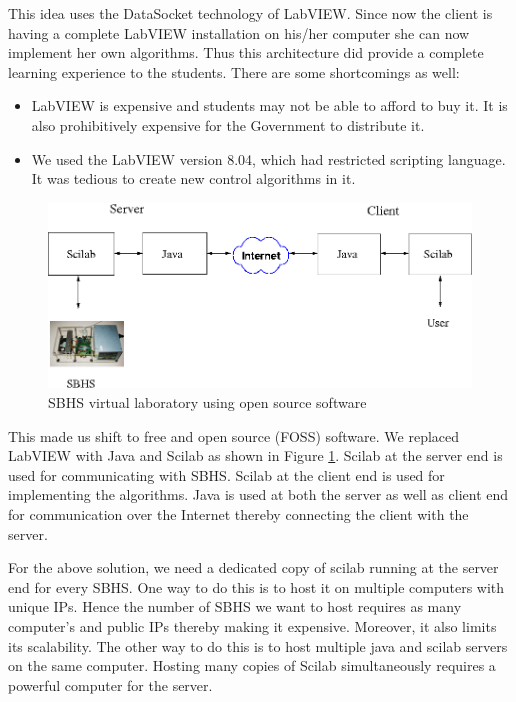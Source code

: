  This idea uses the DataSocket technology of LabVIEW. Since now the
 client is having a complete LabVIEW installation on his/her computer
 she can now implement her own algorithms.  Thus this architecture did
 provide a complete learning experience to the students.  There are
 some shortcomings as well:

\begin{itemize}
\item LabVIEW is expensive and students may not be able to afford to
  buy it.  It is also prohibitively expensive for the Government to
  distribute it.

\item We used the LabVIEW version 8.04, which had restricted scripting
  language.  It was tedious to create new control algorithms in it.
\end{itemize}
\begin{figure}
\includegraphics[width=\linewidth]{IEEE-Chile/figures/vlab-3.png}
\caption{SBHS virtual laboratory using open source software}
\label{fig:third}
\end{figure}
This made us shift to free and open source (FOSS) software. We
replaced LabVIEW with Java and Scilab as shown in Figure
\ref{fig:third}. Scilab at the server end is used for communicating
with SBHS. Scilab at the client end is used for implementing the
algorithms. Java is used at both the server as well as client end for
communication over the Internet thereby connecting the client with the
server. 

For the above solution, we need a dedicated copy of scilab running at
the server end for every SBHS. One way to do this is to host it on
multiple computers with unique IPs. Hence the number of SBHS we want
to host requires as many computer's and public IPs thereby making
it expensive. Moreover, it also limits its scalability. The other way
to do this is to host multiple java and scilab servers on the same
computer.  Hosting many copies of Scilab simultaneously requires a
powerful computer for the server.

